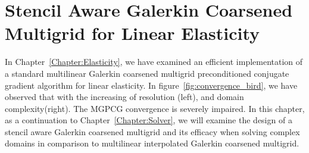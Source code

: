 \chapter{Stencil Aware Galerkin Coarsened Multigrid for Linear Elasticity} 
\label{Chapter:BBMG}
In Chapter~\ref{Chapter:Elasticity}, we have examined an efficient implementation of a standard multilinear Galerkin coarsened multigrid preconditioned conjugate gradient algorithm for linear elasticity. In figure~\ref{fig:convergence_bird}, we have observed that with the increasing of resolution (left), and domain complexity(right). The MGPCG convergence is severely impaired. In this chapter, as a continuation to  Chapter~\ref{Chapter:Solver}, we will examine the design of a stencil aware Galerkin coarsened multigrid and its efficacy when solving complex domains in comparison to multilinear interpolated Galerkin coarsened multigrid.





